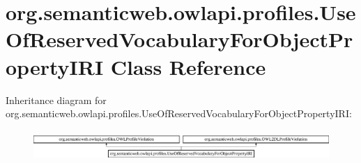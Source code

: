 \hypertarget{classorg_1_1semanticweb_1_1owlapi_1_1profiles_1_1_use_of_reserved_vocabulary_for_object_property_i_r_i}{\section{org.\-semanticweb.\-owlapi.\-profiles.\-Use\-Of\-Reserved\-Vocabulary\-For\-Object\-Property\-I\-R\-I Class Reference}
\label{classorg_1_1semanticweb_1_1owlapi_1_1profiles_1_1_use_of_reserved_vocabulary_for_object_property_i_r_i}
}
Inheritance diagram for org.\-semanticweb.\-owlapi.\-profiles.\-Use\-Of\-Reserved\-Vocabulary\-For\-Object\-Property\-I\-R\-I\-:\begin{figure}[H]
\begin{center}
\leavevmode
\includegraphics[height=1.166667cm]{classorg_1_1semanticweb_1_1owlapi_1_1profiles_1_1_use_of_reserved_vocabulary_for_object_property_i_r_i}
\end{center}
\end{figure}
